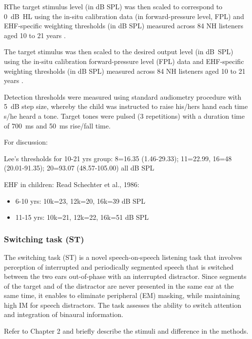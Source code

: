 \documentclass[a4paper, twoside]{templates/ociamthesis}
\begin{document}
\colorbox[HTML]{CCCCFF}{RThe target stimulus level (in dB SPL) was then scaled to correspond to 0~dB~HL using the in-situ calibration data (in forward-pressure level, FPL) and EHF-specific weighting thresholds (in dB SPL) measured across 84 NH listeners aged 10 to 21 years \autocite[see Table 1 in][]{Lee2012}.}

The target stimulus was then scaled to the desired output level (in dB~SPL) using the in-situ calibration forward-pressure level (FPL) data and EHF-specific weighting thresholds (in dB SPL) measured across 84 NH listeners aged 10 to 21 years \autocite[see Table 1 in][]{Lee2012}.

Detection thresholds were measured using standard audiometry procedure with 5~dB step size, whereby the child was instructed to raise his/hers hand each time s/he heard a tone. Target tones were pulsed (3 repetitions) with a duration time of 700~ms and 50~ms rise/fall time.

For discussion:

Lee's thresholds for 10-21 yrs group: 8=16.35 (1.46-29.33); 11=22.99, 16=48 (20.01-91.35); 20=93.07 (48.57-105.00) all dB SPL

EHF in children: Read Schechter et al., 1986:

\begin{itemize}
\item
  6-10 yrs: 10k=23, 12k=20, 16k=39 dB SPL
\item
  11-15 yrs: 10k=21, 12k=22, 16k=51 dB SPL
\end{itemize}

\hypertarget{switching-task-st}{%
\subsubsection{Switching task (ST)}\label{switching-task-st}}

The switching task (ST) is a novel speech-on-speech listening task that involves perception of interrupted and periodically segmented speech that is switched between the two ears out-of-phase with an interrupted distractor. Since segments of the target and of the distractor are never presented in the same ear at the same time, it enables to eliminate peripheral (EM) masking, while maintaining high IM for speech distractors. The task assesses the ability to switch attention and integration of binaural information.

Refer to Chapter 2 and briefly describe the stimuli and difference in the methods.
\end{document}
